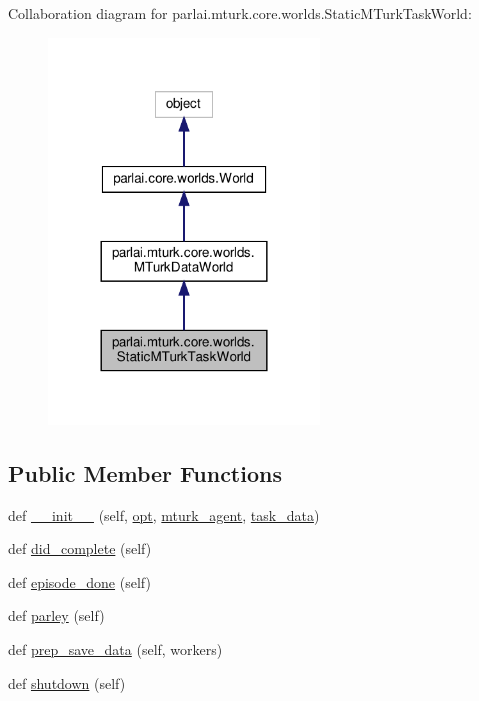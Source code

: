 Collaboration diagram for parlai.\+mturk.\+core.\+worlds.\+Static\+M\+Turk\+Task\+World\+:\nopagebreak
\begin{figure}[H]
\begin{center}
\leavevmode
\includegraphics[width=204pt]{d9/d85/classparlai_1_1mturk_1_1core_1_1worlds_1_1StaticMTurkTaskWorld__coll__graph}
\end{center}
\end{figure}
\subsection*{Public Member Functions}
\begin{DoxyCompactItemize}
\item 
def \hyperlink{classparlai_1_1mturk_1_1core_1_1worlds_1_1StaticMTurkTaskWorld_a6bf4b23fee7509456b074b9587043d17}{\+\_\+\+\_\+init\+\_\+\+\_\+} (self, \hyperlink{classparlai_1_1core_1_1worlds_1_1World_a3640d92718acd3e6942a28c1ab3678bd}{opt}, \hyperlink{classparlai_1_1mturk_1_1core_1_1worlds_1_1StaticMTurkTaskWorld_a25d8cc71893b0b67169cba15f142b1bc}{mturk\+\_\+agent}, \hyperlink{classparlai_1_1mturk_1_1core_1_1worlds_1_1StaticMTurkTaskWorld_ad8f9036d50f5787b4872609a17c267e0}{task\+\_\+data})
\item 
def \hyperlink{classparlai_1_1mturk_1_1core_1_1worlds_1_1StaticMTurkTaskWorld_a2711944f83104bc843ff81293674c6ab}{did\+\_\+complete} (self)
\item 
def \hyperlink{classparlai_1_1mturk_1_1core_1_1worlds_1_1StaticMTurkTaskWorld_a07853455a3ffdc3d7142331c1d74649c}{episode\+\_\+done} (self)
\item 
def \hyperlink{classparlai_1_1mturk_1_1core_1_1worlds_1_1StaticMTurkTaskWorld_a83e09ea1d4ae320941d72b7c72897d3b}{parley} (self)
\item 
def \hyperlink{classparlai_1_1mturk_1_1core_1_1worlds_1_1StaticMTurkTaskWorld_a38d3d55c327426feb97d42c42c5cb49e}{prep\+\_\+save\+\_\+data} (self, workers)
\item 
def \hyperlink{classparlai_1_1mturk_1_1core_1_1worlds_1_1StaticMTurkTaskWorld_a793ecd56172f7bfd540b6d92887fb3f9}{shutdown} (self)
\end{DoxyCompactItemize}
